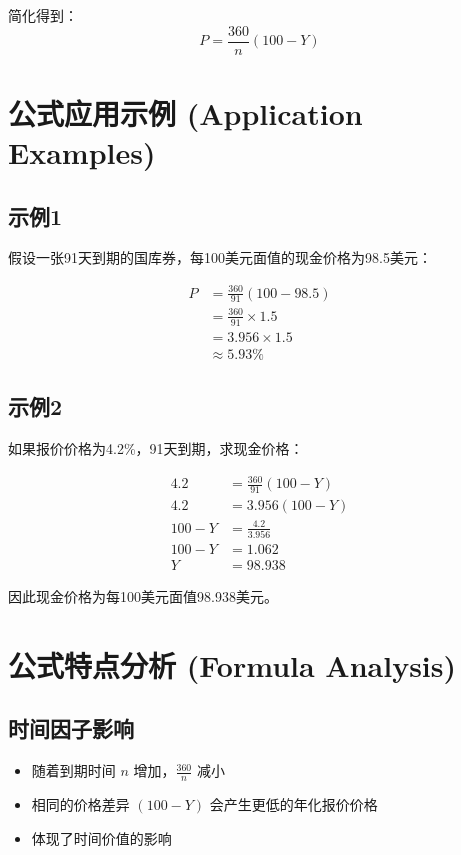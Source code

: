 简化得到：
\begin{equation}
\boxed{P = \frac{360}{n}(100 - Y)}
\end{equation}

\section{公式应用示例 (Application Examples)}

\subsection{示例1}
假设一张91天到期的国库券，每100美元面值的现金价格为98.5美元：

\begin{align}
P &= \frac{360}{91}(100 - 98.5)\\
&= \frac{360}{91} \times 1.5\\
&= 3.956 \times 1.5\\
&\approx 5.93\%
\end{align}

\subsection{示例2}
如果报价价格为4.2\%，91天到期，求现金价格：

\begin{align}
4.2 &= \frac{360}{91}(100 - Y)\\
4.2 &= 3.956(100 - Y)\\
100 - Y &= \frac{4.2}{3.956}\\
100 - Y &= 1.062\\
Y &= 98.938
\end{align}

因此现金价格为每100美元面值98.938美元。

\section{公式特点分析 (Formula Analysis)}

\subsection{时间因子影响}
\begin{itemize}
    \item 随着到期时间 $n$ 增加，$\frac{360}{n}$ 减小
    \item 相同的价格差异 $(100-Y)$ 会产生更低的年化报价价格
    \item 体现了时间价值的影响
\end{itemize}

